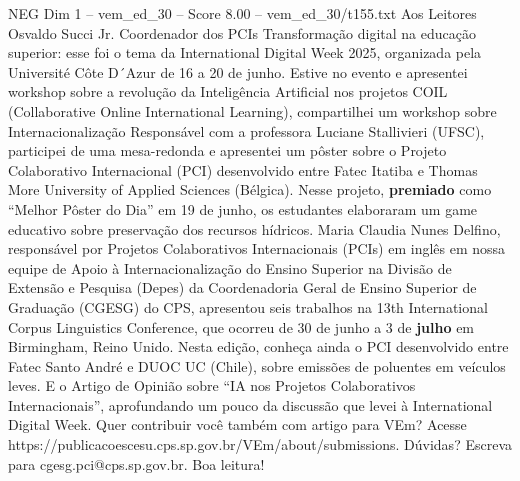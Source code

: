 \begin{textsample}{NEG Dim 1 – vem\_ed\_30 – Score 8.00 – vem\_ed\_30/t155.txt}  \label{ex:f1_neg_161}
Aos Leitores Osvaldo Succi Jr.
Coordenador dos PCIs Transformação digital na educação superior: esse foi o tema da International Digital Week 2025, organizada pela Université Côte D´Azur de 16 a 20 de junho.
Estive no evento e apresentei workshop sobre a revolução da Inteligência Artificial nos projetos COIL (Collaborative Online International Learning), compartilhei um workshop sobre Internacionalização Responsável com a professora Luciane Stallivieri (UFSC), participei de uma mesa-redonda e apresentei um pôster sobre o Projeto Colaborativo Internacional (PCI) desenvolvido entre Fatec Itatiba e Thomas More University of Applied Sciences (Bélgica).
Nesse projeto, \textbf{premiado} como “Melhor Pôster do Dia” em 19 de junho, os estudantes elaboraram um game educativo sobre preservação dos recursos hídricos.
Maria Claudia Nunes Delfino, responsável por Projetos Colaborativos Internacionais (PCIs) em inglês em nossa equipe de Apoio à Internacionalização do Ensino Superior na Divisão de Extensão e Pesquisa (Depes) da Coordenadoria Geral de Ensino Superior de Graduação (CGESG) do CPS, apresentou seis trabalhos na 13th International Corpus Linguistics Conference, que ocorreu de 30 de junho a 3 de \textbf{julho} em Birmingham, Reino Unido.
Nesta edição, conheça ainda o PCI desenvolvido entre Fatec Santo André e DUOC UC (Chile), sobre emissões de poluentes em veículos leves.
E o Artigo de Opinião sobre “IA nos Projetos Colaborativos Internacionais”, aprofundando um pouco da discussão que levei à International Digital Week.
Quer contribuir você também com artigo para VEm?
Acesse https://publicacoescesu.cps.sp.gov.br/VEm/about/submissions.
Dúvidas?
Escreva para cgesg.pci@cps.sp.gov.br.
Boa leitura!

\end{textsample}
